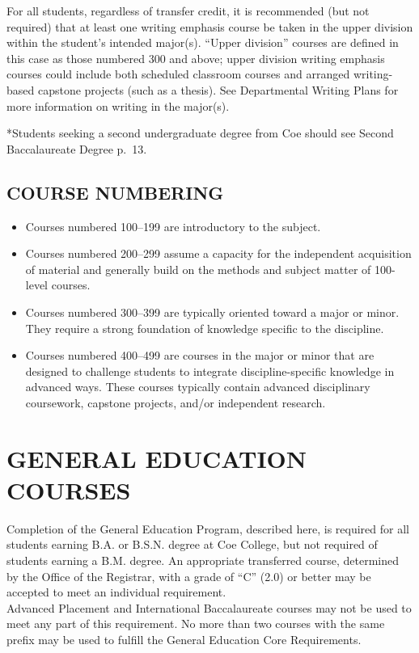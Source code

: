 \documentclass[
  letterpaper,
]{scrbook}
\providecommand{\tightlist}{%
  \setlength{\itemsep}{0pt}\setlength{\parskip}{0pt}}
\begin{document}
For all students, regardless of transfer credit, it is recommended (but
not required) that at least one writing emphasis course be taken in the
upper division within the student's intended major(s). ``Upper
division'' courses are defined in this case as those numbered 300 and
above; upper division writing emphasis courses could include both
scheduled classroom courses and arranged writing-based capstone projects
(such as a thesis). See Departmental Writing Plans for more information
on writing in the major(s).

*Students seeking a second undergraduate degree from Coe should see
Second Baccalaureate Degree p.~13.

\section{COURSE NUMBERING}\label{course-numbering}

\begin{itemize}
\tightlist
\item
  Courses numbered 100--199 are introductory to the subject.
\item
  Courses numbered 200--299 assume a capacity for the independent
  acquisition of material and generally build on the methods and subject
  matter of 100-level courses.
\item
  Courses numbered 300--399 are typically oriented toward a major or
  minor. They require a strong foundation of knowledge specific to the
  discipline.
\item
  Courses numbered 400--499 are courses in the major or minor that are
  designed to challenge students to integrate discipline-specific
  knowledge in advanced ways. These courses typically contain advanced
  disciplinary coursework, capstone projects, and/or independent
  research.
\end{itemize}

\chapter{GENERAL EDUCATION COURSES}\label{sec-general-education-courses}

Completion of the General Education Program, described here, is required
for all students earning B.A. or B.S.N. degree at Coe College, but not
required of students earning a B.M. degree. An appropriate transferred
course, determined by the Office of the Registrar, with a grade of ``C''
(2.0) or better may be accepted to meet an individual requirement.\\
Advanced Placement and International Baccalaureate courses may not be
used to meet any part of this requirement. No more than two courses with
the same prefix may be used to fulfill the General Education Core
Requirements.
\end{document}
